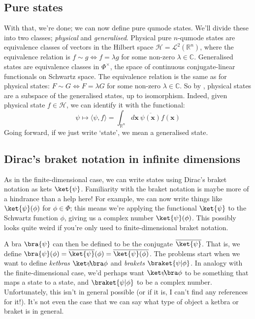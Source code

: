 \subsection{Pure states}

With that, we're done; we can now define pure qumode states.
We'll divide these into two classes; \textit{physical} and \textit{generalised}.
Physical pure $n$-qumode states are equivalence classes of vectors in the Hilbert space $\mathcal{H} = \mathcal{L}^2(\mathbb{R}^n)$, where the equivalence relation is $f \sim g \iff f = \lambda g$ for some non-zero $\lambda \in \mathbb{C}$.
Generalised states are equivalence classes in $\Phi^\times$, the space of continuous conjugate-linear functionals on Schwartz space.
The equivalence relation is the same as for physical states: $F \sim G \iff F = \lambda G$ for some non-zero $\lambda \in \mathbb{C}$.
So by , physical states are a subspace of the generalised states, up to isomorphism.
Indeed, given physical state $f \in \mathcal{H}$, we can identify it with the functional:
\begin{equation}
    \psi \mapsto \langle \psi,f \rangle = \int_{\mathbb{R}^n} d\boldsymbol{x}\ \overline{\psi(\boldsymbol{x})} f(\boldsymbol{x})
\end{equation}
Going forward, if we just write `state', we mean a generalised state.

\subsection{Dirac's braket notation in infinite dimensions}\label{subsec:braket_notation}

As in the finite-dimensional case, we can write states using Dirac's braket notation as kets $\ket{\psi}$.
Familiarity with the braket notation is maybe more of a hindrance than a help here!
For example, we can now write things like $\ket{\psi}(\phi)$ for $\phi \in \Phi$; this means we're applying the functional $\ket{\psi}$ to the Schwartz function $\phi$, giving us a complex number $\ket{\psi}(\phi)$.
This possibly looks quite weird if you're only used to finite-dimensional braket notation.

A bra $\bra{\psi}$ can then be defined to be the conjugate $\overline{\ket{\psi}}$.
That is, we define $\bra{\psi}(\phi) = \overline{\ket{\psi}}(\phi) = \overline{\ket{\psi}(\phi)}$.
The problems start when we want to define \textit{ketbras} $\ketbra{\psi}{\phi}$ and \textit{brakets} $\braket{\psi | \phi}$.
In analogy with the finite-dimensional case, we'd perhaps want $\ketbra{\psi}{\phi}$ to be something that maps a state to a state, and $\braket{\psi | \phi}$ to be a complex number.
Unfortunately, this isn't in general possible (or if it is, I can't find any references for it!).
It's not even the case that we can say what type of object a ketbra or braket is in general.

